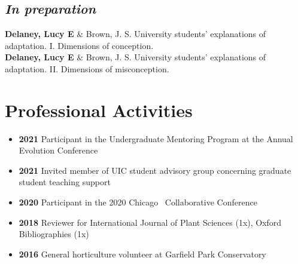 \documentclass[]{article}
\newlength{\cslhangindent}
\newenvironment{cslreferences}
{\setlength{\parindent}{0pt}
\everypar{\setlength{\hangindent}{\cslhangindent}}\ignorespaces}
{\par}
\begin{document}
\vspace{-4mm}
\subsection{\fontsize{12}{36}\selectfont \textit{In preparation}}
\vspace{-2mm}
\begin{cslreferences}
\textbf{Delaney, Lucy E} \& Brown, J. S. University students' explanations of adaptation. I. Dimensions of conception.\\

\textbf{Delaney, Lucy E} \& Brown, J. S. University students' explanations of adaptation. II. Dimensions of misconception.
\end{cslreferences}
\vspace{8mm}


\section{\fontsize{16}{48}\selectfont Professional Activities}



\begin{itemize}[label=$\mathwitch*$]
\item{\textbf{2021} Participant in the Undergraduate Mentoring Program at the Annual Evolution Conference}
\item{\textbf{2021} Invited member of UIC student advisory group concerning graduate student teaching support}
\item{\textbf{2020} Participant in the 2020 Chicago \faRProject\ Collaborative Conference \href{https://chircollab.github.io/}{\faLink}}
\item{\textbf{2018} Reviewer for International Journal of Plant Sciences (1x), Oxford Bibliographies (1x)}
\item{\textbf{2016} General horticulture volunteer at Garfield Park Conservatory \href{https://garfieldconservatory.org/}{\faLink}}
\end{itemize}

\vspace{1mm}

\end{document}
